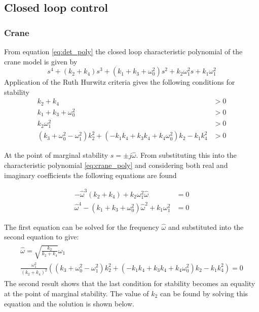 \documentclass{article}
\begin{document}
\subsection{Closed loop control}


\subsubsection{Crane}

From equation \ref{eq:det_poly} the closed loop characteristic polynomial of the crane model is given by
\begin{equation}
  s^{4} + \left(k_{2} + k_{4}\right) s^{3} + \left(k_{1} + k_{3} + \omega_{0}^{2}\right) s^{2} + k_{2} \omega_{1}^{2} s + k_{1} \omega_{1}^{2}
  \label{eq:crane_poly}
\end{equation}
Application of the Ruth Hurwitz criteria gives the following conditions for stability
\begin{align}
  k_{2} + k_{4} &> 0 \\
  k_{1} + k_{3} + \omega_{0}^{2} &> 0 \\
  k_{2} \omega_{1}^{2} &> 0 \\
  \left(k_{3} + \omega_{0}^{2} - \omega_{1}^{2}\right) k_{2}^{2} + \left(- k_{1} k_{4} + k_{3} k_{4} + k_{4} \omega_{0}^{2}\right) k_{2} -  k_{1} k_{4}^{2} &> 0
\end{align}

At the point of marginal stability $s = \pm j\hat{\omega}$.
From substituting this into the characteristic polynomial \ref{eq:crane_poly} and considering both real and imaginary coefficients the following equations are found

\begin{align}
    - \hat{\omega}^{3} \left(k_{2} + k_{4}\right) + k_{2} \omega_{1}^{2} \hat{\omega}  &= 0 \\
    \hat{\omega}^{4} - \left(k_{1} + k_{3} + \omega_{0}^{2}\right)\hat{\omega}^{2} + k_{1} \omega_{1}^{2} &= 0
\end{align}

The first equation can be solved for the frequency $\hat{\omega}$ and substituted into the second equation to give:
\begin{align}
  \begin{gathered}
    \hat{\omega} = \sqrt{\frac{k_2}{k_2 + k_4}} \omega_1 \label{eq:marginal_stability_frequency}\\
    \frac{\omega_1^2}{(k_2+k_4)^2} \left( \left(k_{3} + \omega_{0}^{2} - \omega_{1}^{2}\right) k_{2}^{2} + \left(- k_{1} k_{4} + k_{3} k_{4} + k_{4} \omega_{0}^{2}\right) k_{2} -  k_{1} k_{4}^{2} \right) = 0
  \end{gathered}
\end{align}
The second result shows that the last condition for stability becomes an equality at the point of marginal stability.
The value of $k_2$ can be found by solving this equation and the solution is shown below.
\end{document}
